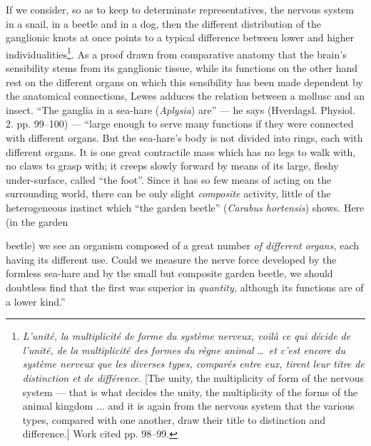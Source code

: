 \documentclass[12pt,a4paper]{book}
\begin{document}
\setcounter{footnote}{0}
If we consider, so as to keep to determinate representatives, the nervous system in a
snail, in a beetle and in a dog, then the different distribution of the ganglionic
knots at once points to a typical difference between lower and higher
individualities\footnote{\textit{\emph{L'unité, la multiplicité} de forme du système
nerveux, voilà ce qui décide de \emph{l'unité, de la multiplicité} des formes du règne
animal} \dots\ \textit{et c'est encore du système nerveux que les diverses types,
comparés entre eux, tirent leur titre de distinction et de différence.} [The unity,
the multiplicity of form of the nervous system --- that is what decides the unity, the
multiplicity of the forms of the animal kingdom ... and it is again from the nervous
system that the various types, compared with one another, draw their title to
distinction and difference.] Work cited pp. 98--99.}. As a proof drawn from
comparative anatomy that the brain's sensibility stems from its ganglionic tissue,
while its functions on the other hand rest on the different organs on which this
sensibility has been made dependent by the anatomical connections, Lewes adduces the
relation between a mollusc and an insect. ``The ganglia in a sea-hare
(\textit{Aplysia}) are'' --- he says (Hverdagsl. Physiol. 2. pp. 99--100) --- ``large
enough to serve many functions if they were connected with different organs. But the
sea-hare's body is not divided into rings, each with different organs. It is one
great contractile mass which has no legs to walk with, no claws to grasp with; it
creeps slowly forward by means of its large, fleshy under-surface, called ``the foot''.
Since it has so few means of acting on the surrounding world, there can be only slight
\emph{composite} activity, little of the heterogeneous instinct which ``the garden
beetle'' (\textit{Carabus hortensis}) shows. Here (in the garden%

beetle) we see an organism composed of a great number \emph{of different organs,} each
having its different use. Could we measure the nerve force developed by the formless
sea-hare and by the small but composite garden beetle, we should doubtless find that
the first was superior in \emph{quantity,} although its functions are of a lower
kind.''
\end{document}
